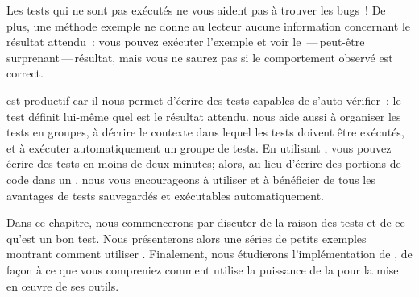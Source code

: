 \documentclass[a4paper,10pt,twoside]{book}
\begin{document}
Les tests qui ne sont pas exécutés ne vous aident pas à trouver les bugs~! De plus, une méthode exemple ne donne au lecteur aucune information concernant le résultat attendu~: vous pouvez exécuter l'exemple et voir le \,---\,peut-être surprenant\,---\,résultat, mais vous ne saurez pas si le comportement observé est correct.

\sunit est productif car il nous permet d'écrire des tests capables de s'auto-vérifier~: le test définit lui-même quel est le résultat attendu. \sunit nous aide aussi à organiser les tests en groupes, à décrire le contexte dans lequel les tests doivent être exécutés, et à exécuter automatiquement un groupe de tests. En utilisant \sunit, vous pouvez écrire des tests en moins de deux minutes; alors, au lieu d'écrire des portions de code dans un , nous vous encourageons à utiliser \sunit et à bénéficier de tous les avantages de tests sauvegardés et exécutables automatiquement.

Dans ce chapitre, nous commencerons par discuter de la raison des
tests et de ce qu'est un bon test. Nous présenterons alors une séries de petits exemples montrant comment utiliser \sunit. Finalement, nous étudierons l'implémentation de \sunit, de façon à ce que vous compreniez comment \st utilise la puissance de la  pour la mise en {\oe}uvre de ses outils.
\end{document}
